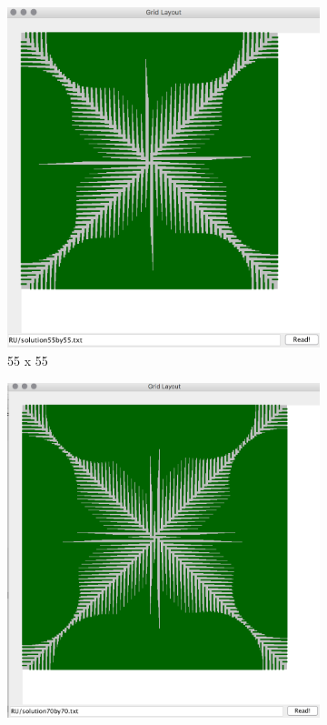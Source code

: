 \documentclass{article}
\begin{document}
\begin{spacing}{1.1}
\begin{figure}[H]
\begin{subfigure}{0.4\textwidth}
            \includegraphics[width = \textwidth]{RU1.png}
            \caption{55 x 55}
        \end{subfigure}
        \begin{subfigure}{0.4\textwidth}
            \includegraphics[width = \textwidth]{RU2.png}

\end{subfigure}
\end{figure}
\end{spacing}
\end{document}
